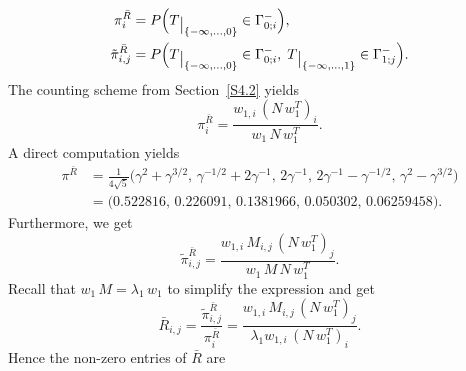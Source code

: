 \documentclass[11pt]{article}
\providecommand{\1}{\mathBB{1}}
\newcommand{\rest}[1]{\raisebox{-0.3em}{$\big|_{\scriptstyle
#1}$}}
\begin{document}
\begin{equation}
\label{E6.09}
\begin{aligned}
\pi^{\bar R}_i&=P\Big(T\rest{\{-\infty,\ldots,0\}}\in\Gamma^-_{0;i}\Big),\\
\tilde\pi^{\bar R}_{i,j}&=P\Big(T\rest{\{-\infty,\ldots,0\}}\in\Gamma^-_{0;i},
\;T\rest{\{-\infty,\ldots,1\}}\in\Gamma^-_{1;j}\Big).
\end{aligned}
\end{equation}
The counting scheme from Section~\ref{S4.2} yields
\begin{equation}
\label{E6.10}
\pi^{\bar R}_i=\frac{w_{1,i}\,(N\,w_{1}^T)_i}{w_1\,N\,w_1^T}.
\end{equation}
A direct computation yields
\begin{equation}
\label{E6.11}
\begin{aligned}
\pi^{\bar R}&=\frac{1}{4\sqrt{5}}\Big(\gamma^2+
\gamma^{3/2},\,
\gamma^{-1/2}+
2\gamma^{-1},\,
2\gamma^{-1},\,
2\gamma^{-1}-\gamma^{-1/2},\,
\gamma^2-\gamma^{3/2}\Big)\\
&=\big(0.522816,\, 0.226091,\, 0.1381966,\, 0.050302, \,0.06259458\big).
\end{aligned}
\end{equation}
Furthermore, we get
\begin{equation}
\label{E6.12}
\tilde\pi^{\bar R}_{i,j}=\frac{w_{1,i}\,M_{i,j}\,(N\,w_1^T)_j}
{w_1\,M\,N\,w_1^T}.
\end{equation}
Recall that $w_1\,M=\lambda_1\,w_1$ to simplify the expression and get
\begin{equation}
\label{E6.13}
\bar R_{i,j}=\frac{\tilde\pi^{\bar R}_{i,j}}{\pi^{\bar R}_i}=
\frac{w_{1,i}\,M_{i,j}\,(N\,w_{1}^T)_j}
{\lambda_1w_{1,i}\,(N\,w_{1}^T)_i}.
\end{equation}
Hence the non-zero entries of $\bar R$ are
\end{document}
